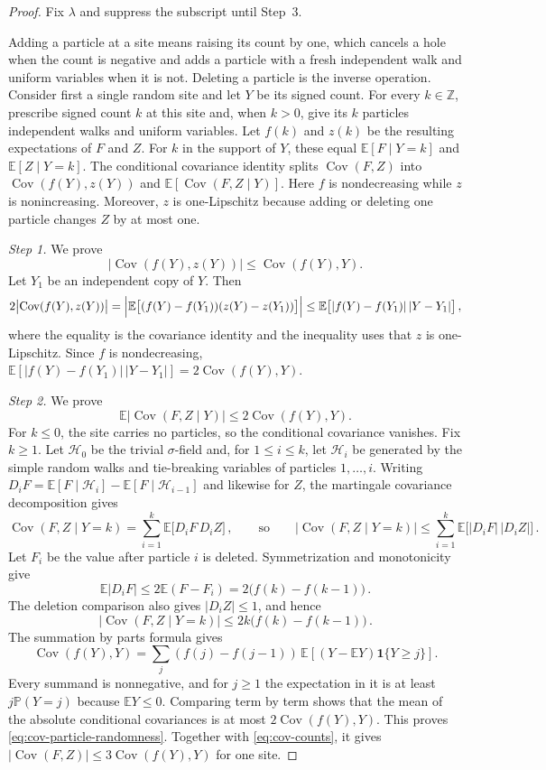 \documentclass[11pt]{amsart}
\theoremstyle{plain}
\theoremstyle{definition}
\newcommand{\Z}{\mathbb{Z}}
\newcommand{\E}{\mathbb{E}}
\renewcommand{\P}{\mathbb{P}}
\DeclareMathOperator{\Cov}{Cov}
\newcommand{\one}{\mathbf{1}}
\begin{document}
\begin{proof}
	Fix $\lambda$ and suppress the subscript until Step~3.

	Adding a particle at a site means raising its count by one, which cancels a
	hole when the count is negative and adds a particle with a fresh independent
	walk and uniform variables when it is not. Deleting a particle is the inverse
	operation. Consider first a single random site and let $Y$ be its signed
	count. For every $k\in\Z$, prescribe signed count $k$ at this site and, when
	$k>0$, give its $k$ particles independent walks and uniform variables. Let $f(k)$
	and $z(k)$ be the resulting expectations of $F$ and $Z$. For $k$ in the
	support of $Y$, these equal $\E[F\mid Y=k]$ and $\E[Z\mid Y=k]$.
	The conditional covariance identity splits $\Cov(F,Z)$ into
	$\Cov(f(Y),z(Y))$ and $\E[\Cov(F,Z\mid Y)]$. Here $f$ is nondecreasing while
	$z$ is nonincreasing. Moreover, $z$ is one-Lipschitz because adding or deleting one
	particle changes $Z$ by at most one.

	\smallskip
	\noindent\emph{Step 1.} We prove
	\begin{equation}\label{eq:cov-counts}
		|\Cov(f(Y),z(Y))|\leq\Cov(f(Y),Y).
	\end{equation}
	Let $Y_1$ be an independent copy of $Y$. Then
	\[
		2\bigl|\Cov(f(Y),z(Y))\bigr|
		=\Bigl|\E\bigl[(f(Y)-f(Y_1))(z(Y)-z(Y_1))\bigr]\Bigr|
		\leq\E\bigl[|f(Y)-f(Y_1)|\,|Y-Y_1|\bigr]\,,
	\]
	where the equality is the covariance identity and the inequality uses that
	$z$ is one-Lipschitz. Since $f$ is nondecreasing,
	$\E[|f(Y)-f(Y_1)|\,|Y-Y_1|]=2\Cov(f(Y),Y)$.

	\smallskip
	\noindent\emph{Step 2.} We prove
	\begin{equation}\label{eq:cov-particle-randomness}
		\E|\Cov(F,Z\mid Y)|\leq2\Cov(f(Y),Y).
	\end{equation}
	For $k\leq0$, the site carries no particles, so the conditional covariance
	vanishes. Fix $k\geq1$. Let $\mathcal H_0$ be the trivial $\sigma$-field and,
	for $1\leq i\leq k$, let $\mathcal H_i$ be generated by the simple random
	walks and tie-breaking variables of particles $1,\ldots,i$.
	Writing $D_iF=\E[F\mid\mathcal H_i]-\E[F\mid\mathcal H_{i-1}]$ and likewise for
	$Z$, the martingale covariance decomposition gives
	\[
		\Cov(F,Z\mid Y=k)=\sum_{i=1}^k\E\bigl[D_iF\,D_iZ\bigr]\,,
		\qquad\text{so}\qquad
		\bigl|\Cov(F,Z\mid Y=k)\bigr|\leq\sum_{i=1}^k\E\bigl[|D_iF|\,|D_iZ|\bigr]\,.
	\]
	Let $F_i$ be the value after particle $i$ is deleted. Symmetrization and
	monotonicity give
	\[
		\E|D_iF|
		\leq2\E(F-F_i)
		=2\bigl(f(k)-f(k-1)\bigr)\,.
	\]
	The deletion comparison also gives $|D_iZ|\leq1$, and hence
	\[
		\bigl|\Cov(F,Z\mid Y=k)\bigr|\leq2k\bigl(f(k)-f(k-1)\bigr)\,.
	\]
	The summation by parts formula gives
	\[
		\Cov(f(Y),Y)=\sum_j(f(j)-f(j-1))\,
		\E[(Y-\E Y)\one\{Y\geq j\}].
	\]
	Every summand is nonnegative, and for $j\geq1$ the expectation in it is at
	least $j\P(Y=j)$ because $\E Y\leq0$. Comparing term by term shows that the
	mean of the absolute conditional covariances is at most
	$2\Cov(f(Y),Y)$. This proves \eqref{eq:cov-particle-randomness}.
	Together with \eqref{eq:cov-counts}, it gives
	$|\Cov(F,Z)|\leq3\Cov(f(Y),Y)$ for one site.


\end{proof}
\end{document}
